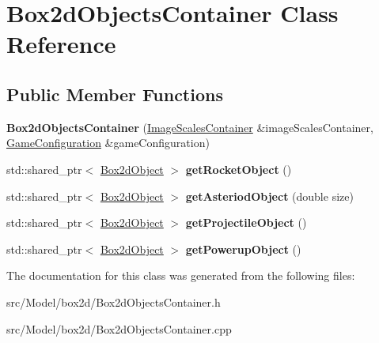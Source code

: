 \hypertarget{classBox2dObjectsContainer}{}\section{Box2d\+Objects\+Container Class Reference}
\label{classBox2dObjectsContainer}
\subsection*{Public Member Functions}
\begin{DoxyCompactItemize}
\item 
{\bfseries Box2d\+Objects\+Container} (\hyperlink{classImageScalesContainer}{Image\+Scales\+Container} \&image\+Scales\+Container, \hyperlink{classGameConfiguration}{Game\+Configuration} \&game\+Configuration)\hypertarget{classBox2dObjectsContainer_aea1ca4c4acceff6bf31d079a94acc948}{}\label{classBox2dObjectsContainer_aea1ca4c4acceff6bf31d079a94acc948}

\item 
std\+::shared\+\_\+ptr$<$ \hyperlink{classBox2dObject}{Box2d\+Object} $>$ {\bfseries get\+Rocket\+Object} ()\hypertarget{classBox2dObjectsContainer_a074e14b69d50fd592e661ca4ecc35b8c}{}\label{classBox2dObjectsContainer_a074e14b69d50fd592e661ca4ecc35b8c}

\item 
std\+::shared\+\_\+ptr$<$ \hyperlink{classBox2dObject}{Box2d\+Object} $>$ {\bfseries get\+Asteriod\+Object} (double size)\hypertarget{classBox2dObjectsContainer_afe57a3e2e321bd411ab585a7f3ea262b}{}\label{classBox2dObjectsContainer_afe57a3e2e321bd411ab585a7f3ea262b}

\item 
std\+::shared\+\_\+ptr$<$ \hyperlink{classBox2dObject}{Box2d\+Object} $>$ {\bfseries get\+Projectile\+Object} ()\hypertarget{classBox2dObjectsContainer_acaba2899c36dde3216840df186bf08f3}{}\label{classBox2dObjectsContainer_acaba2899c36dde3216840df186bf08f3}

\item 
std\+::shared\+\_\+ptr$<$ \hyperlink{classBox2dObject}{Box2d\+Object} $>$ {\bfseries get\+Powerup\+Object} ()\hypertarget{classBox2dObjectsContainer_a23006c7f8699cbfb50ce45664259858a}{}\label{classBox2dObjectsContainer_a23006c7f8699cbfb50ce45664259858a}

\end{DoxyCompactItemize}


The documentation for this class was generated from the following files\+:\begin{DoxyCompactItemize}
\item 
src/\+Model/box2d/Box2d\+Objects\+Container.\+h\item 
src/\+Model/box2d/Box2d\+Objects\+Container.\+cpp\end{DoxyCompactItemize}
